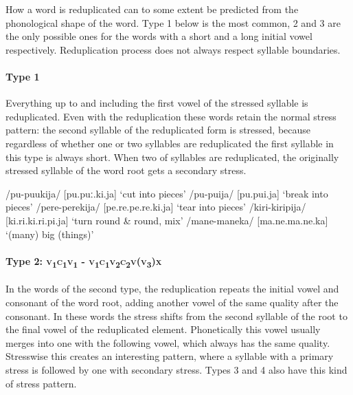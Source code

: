 How a word is reduplicated can to some extent be predicted from the phonological shape of the word.  Type 1 below is the most common, 2 and 3 are the only possible ones for the words with a short and a long initial vowel respectively.  Reduplication process does not always respect syllable boundaries.

\paragraph[Type 1]{Type 1}\label{sec:2:a:z:y:x}

Everything up to and including the first vowel of the stressed syllable is reduplicated.  Even with the reduplication these words retain the normal stress pattern: the second syllable of the reduplicated form is stressed, because regardless of whether one or two syllables are reduplicated the first syllable in this type is always short. When two of syllables are reduplicated, the originally stressed syllable of the word root gets a secondary stress.

\ea
\ea
/pu-puukija/  [pu.{{\textprimstress}puː.ki.ja}]  `cut into pieces'
\ex
/pu-puija/  [pu.{{\textprimstress}pui.ja}]  `break into pieces'
\ex
/pere-perekija/  [pe.{{\textprimstress}}re.pe.{{\textprimstress}}{{\textprimstress}}re.ki.ja]  `tear into pieces'
\ex
/kiri-kiripija/  [ki.{{\textprimstress}}ri.ki.{{\textprimstress}}{{\textprimstress}}ri.pi.ja]  `turn round \& round, mix'
\ex
/mane-maneka/  [ma.{{\textprimstress}}ne.ma.{{\textprimstress}}{{\textprimstress}}ne.ka]  `(many) big (things)'
\z
\z


\paragraph{Type 2:  \textsc{v}\textsubscript{1}\textsc{c}\textsubscript{1}\textsc{v}\textsubscript{1} - \textsc{v}\textsubscript{1}\textsc{c}\textsubscript{1}\textsc{v}\textsubscript{2}\textsc{c}\textsubscript{2}\textsc{v}(\textsc{v}\textsubscript{3})\textsc{x}}\label{sec:2:a:z:y:x}

In the words of the second type, the reduplication repeats the initial vowel and consonant of the word root, adding another vowel of the same quality after the consonant.  In these words the stress shifts from the second syllable of the root to the final vowel of the reduplicated element.  Phonetically this vowel usually merges into one with the following vowel, which always has the same quality.  Stresswise this creates an interesting pattern, where a syllable with a primary stress is followed by one with secondary stress.  Types 3 and 4 also have this kind of stress pattern.

